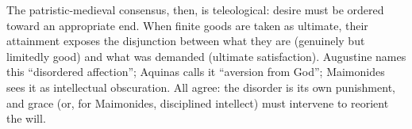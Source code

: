 The patristic-medieval consensus, then, is teleological: desire must be ordered toward an
appropriate end. When finite goods are taken as ultimate, their attainment exposes the
disjunction between what they are (genuinely but limitedly good) and what was demanded
(ultimate satisfaction). Augustine names this ``disordered affection''; Aquinas calls it
``aversion from God''; Maimonides sees it as intellectual obscuration. All agree: the disorder
is its own punishment, and grace (or, for Maimonides, disciplined intellect) must intervene
to reorient the will.
